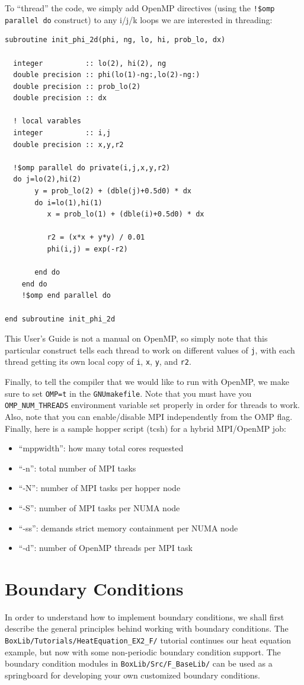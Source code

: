 To ``thread'' the code, we simply add OpenMP directives (using the {\tt !\$omp parallel do} construct) to any i/j/k loops
we are interested in threading:
\begin{lstlisting}[backgroundcolor=\color{light-green}]
subroutine init_phi_2d(phi, ng, lo, hi, prob_lo, dx)

  integer          :: lo(2), hi(2), ng
  double precision :: phi(lo(1)-ng:,lo(2)-ng:)
  double precision :: prob_lo(2)
  double precision :: dx
 
  ! local varables
  integer          :: i,j
  double precision :: x,y,r2

  !$omp parallel do private(i,j,x,y,r2)
  do j=lo(2),hi(2)
       y = prob_lo(2) + (dble(j)+0.5d0) * dx
       do i=lo(1),hi(1)
          x = prob_lo(1) + (dble(i)+0.5d0) * dx

          r2 = (x*x + y*y) / 0.01
          phi(i,j) = exp(-r2)

       end do
    end do
    !$omp end parallel do

end subroutine init_phi_2d
\end{lstlisting}
This User's Guide is not a manual on OpenMP, so simply note that this particular 
construct tells each thread to work on different values of {\tt j}, with each 
thread getting its own local copy of {\tt i}, {\tt x}, {\tt y}, and {\tt r2}.

Finally, to tell the compiler that we would like to run with OpenMP, we make sure to
set {\tt OMP=t} in the {\tt GNUmakefile}.  Note that you must have you 
{\tt OMP\_NUM\_THREADS} environment variable set properly in order for threads to work.
Also, note that you can enable/disable MPI independently from the OMP flag.  Finally,
here is a sample hopper script (tcsh) for a hybrid MPI/OpenMP job:

\begin{itemize}
\item ``mppwidth'': how many total cores requested
\item ``-n'': total number of MPI tasks
\item ``-N'': number of MPI tasks per hopper node
\item ``-S'': number of MPI tasks per NUMA node
\item ``-ss'': demands strict memory containment per NUMA node
\item ``-d'': number of OpenMP threads per MPI task
\end{itemize}
\section{Boundary Conditions}\label{Sec:Boundary Conditions}
In order to understand how to implement boundary conditions, we shall 
first describe the general principles behind working with boundary conditions.
The {\tt BoxLib/Tutorials/HeatEquation\_EX2\_F/} tutorial continues our heat
equation example, but now with some non-periodic boundary condition support.  The boundary
condition modules in {\tt BoxLib/Src/F\_BaseLib/} can be used as a springboard
for developing your own customized boundary conditions.

